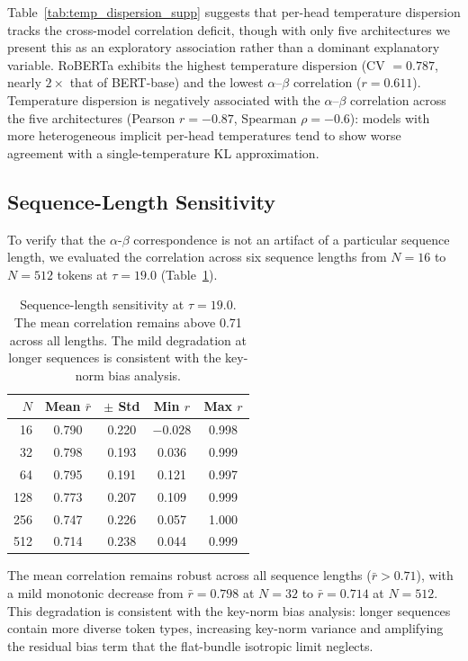 \documentclass[twoside,11pt]{article}
\begin{document}
Table~\ref{tab:temp_dispersion_supp} suggests that per-head temperature dispersion tracks the cross-model correlation deficit, though with only five architectures we present this as an exploratory association rather than a dominant explanatory variable. RoBERTa exhibits the highest temperature dispersion (CV $= 0.787$, nearly $2\times$ that of BERT-base) and the lowest $\alpha$--$\beta$ correlation ($r = 0.611$). Temperature dispersion is negatively associated with the $\alpha$--$\beta$ correlation across the five architectures (Pearson $r = -0.87$, Spearman $\rho = -0.6$): models with more heterogeneous implicit per-head temperatures tend to show worse agreement with a single-temperature KL approximation.

\subsection{Sequence-Length Sensitivity}

To verify that the $\alpha$-$\beta$ correspondence is not an artifact of a particular sequence length, we evaluated the correlation across six sequence lengths from $N = 16$ to $N = 512$ tokens at $\tau = 19.0$ (Table~\ref{tab:seqlen_supp}).

\begin{table}[h]
\centering
\renewcommand{\arraystretch}{1.15}
\begin{tabular}{rcccc}
\hline
$N$ & Mean $\bar{r}$ & $\pm$ Std & Min $r$ & Max $r$ \\
\hline
16 & 0.790 & 0.220 & $-0.028$ & 0.998 \\
32 & 0.798 & 0.193 & 0.036 & 0.999 \\
64 & 0.795 & 0.191 & 0.121 & 0.997 \\
128 & 0.773 & 0.207 & 0.109 & 0.999 \\
256 & 0.747 & 0.226 & 0.057 & 1.000 \\
512 & 0.714 & 0.238 & 0.044 & 0.999 \\
\hline
\end{tabular}
\caption{Sequence-length sensitivity at $\tau = 19.0$. The mean correlation remains above 0.71 across all lengths. The mild degradation at longer sequences is consistent with the key-norm bias analysis.}
\label{tab:seqlen_supp}
\end{table}

The mean correlation remains robust across all sequence lengths ($\bar{r} > 0.71$), with a mild monotonic decrease from $\bar{r} = 0.798$ at $N = 32$ to $\bar{r} = 0.714$ at $N = 512$. This degradation is consistent with the key-norm bias analysis: longer sequences contain more diverse token types, increasing key-norm variance and amplifying the residual bias term that the flat-bundle isotropic limit neglects.
\end{document}

